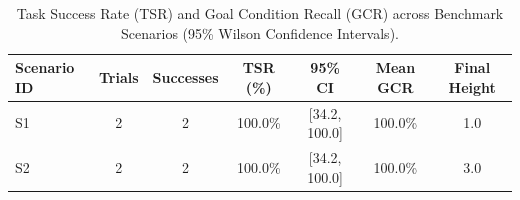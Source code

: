 \begin{table}[t]
\centering
\caption{Task Success Rate (TSR) and Goal Condition Recall (GCR) across Benchmark Scenarios (95\% Wilson Confidence Intervals).}
\label{tab:task_success}
\begin{tabular}{lcccccc}
\toprule
\textbf{Scenario ID} & \textbf{Trials} & \textbf{Successes} & \textbf{TSR (\%)} & \textbf{95\% CI} & \textbf{Mean GCR} & \textbf{Final Height} \\
\midrule
S1 & 2 & 2 & 100.0\% & [34.2, 100.0] & 100.0\% & 1.0 \\
S2 & 2 & 2 & 100.0\% & [34.2, 100.0] & 100.0\% & 3.0 \\
\bottomrule
\end{tabular}
\end{table}